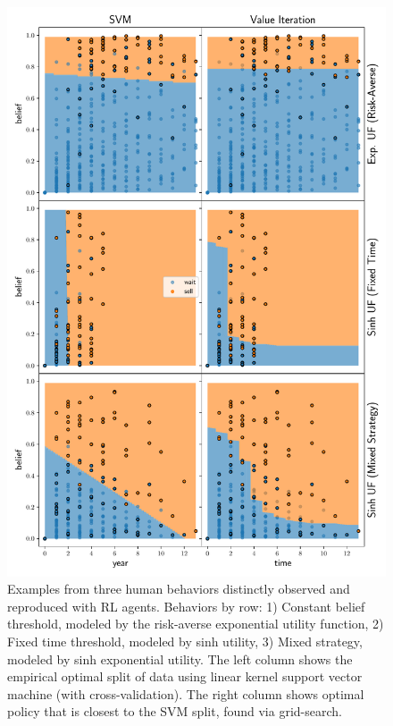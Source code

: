 \begin{figure}[h]
    \centering
    \includegraphics[width=0.99\linewidth]{img/fit}
    \caption{Examples from three human behaviors distinctly observed and reproduced with RL agents. Behaviors by row: 1) Constant belief threshold, modeled by the risk-averse exponential utility function, 2) Fixed time threshold, modeled by sinh utility, 3) Mixed strategy, modeled by sinh exponential utility. The left column shows the empirical optimal split of data using linear kernel support vector machine (with cross-validation). The right column shows optimal policy that is closest to the SVM split, found via grid-search.}
    \label{fig:svm_vs_value}
\end{figure}

